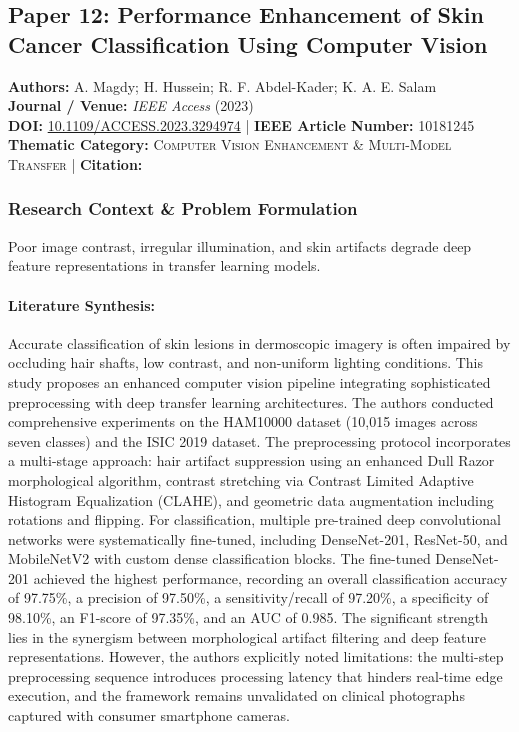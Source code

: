 \subsection{Paper 12: Performance Enhancement of Skin Cancer Classification Using Computer Vision}
\label{sec:paper_12}

\begin{tcolorbox}[colback=gray!5!white,colframe=gray!75!black,title=\textbf{Metadata \& Citation Summary}]
\textbf{Authors:} A. Magdy; H. Hussein; R. F. Abdel-Kader; K. A. E. Salam \\
\textbf{Journal / Venue:} \textit{IEEE Access} (2023) \\
\textbf{DOI:} \href{https://doi.org/10.1109/ACCESS.2023.3294974}{10.1109/ACCESS.2023.3294974} \quad | \quad \textbf{IEEE Article Number:} 10181245 \\
\textbf{Thematic Category:} \textsc{Computer Vision Enhancement \& Multi-Model Transfer} \quad | \quad \textbf{Citation:} \cite{10181245}
\end{tcolorbox}

\subsubsection*{Research Context \& Problem Formulation}
Poor image contrast, irregular illumination, and skin artifacts degrade deep feature representations in transfer learning models.

\paragraph{Literature Synthesis:} Accurate classification of skin lesions in dermoscopic imagery is often impaired by occluding hair shafts, low contrast, and non-uniform lighting conditions. This study proposes an enhanced computer vision pipeline integrating sophisticated preprocessing with deep transfer learning architectures. The authors conducted comprehensive experiments on the HAM10000 dataset (10,015 images across seven classes) and the ISIC 2019 dataset. The preprocessing protocol incorporates a multi-stage approach: hair artifact suppression using an enhanced Dull Razor morphological algorithm, contrast stretching via Contrast Limited Adaptive Histogram Equalization (CLAHE), and geometric data augmentation including rotations and flipping. For classification, multiple pre-trained deep convolutional networks were systematically fine-tuned, including DenseNet-201, ResNet-50, and MobileNetV2 with custom dense classification blocks. The fine-tuned DenseNet-201 achieved the highest performance, recording an overall classification accuracy of 97.75\%, a precision of 97.50\%, a sensitivity/recall of 97.20\%, a specificity of 98.10\%, an F1-score of 97.35\%, and an AUC of 0.985. The significant strength lies in the synergism between morphological artifact filtering and deep feature representations. However, the authors explicitly noted limitations: the multi-step preprocessing sequence introduces processing latency that hinders real-time edge execution, and the framework remains unvalidated on clinical photographs captured with consumer smartphone cameras.

